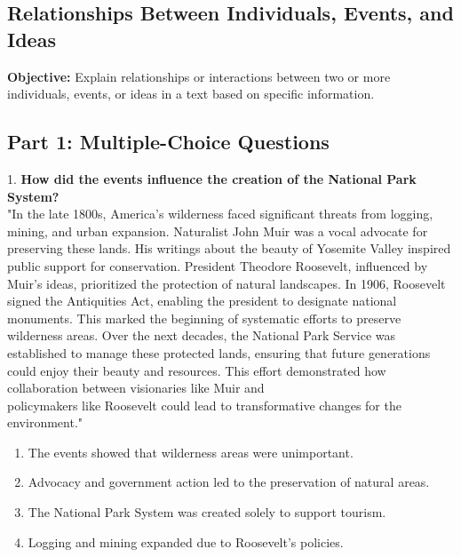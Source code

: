 \documentclass[12pt]{article}
\begin{document}
\subsection*{Relationships Between Individuals, Events, and Ideas}
\onehalfspacing

\begin{tcolorbox}[colframe=black!40, colback=gray!0, title=Learning Objective]
\textbf{Objective:} Explain relationships or interactions between two or more individuals, events, or ideas in a text based on specific information.
\end{tcolorbox}

\subsection*{Part 1: Multiple-Choice Questions}

1. \textbf{How did the events influence the creation of the National Park System?\\}
"In the late 1800s, America’s wilderness faced significant threats from logging, \\mining, and urban expansion. Naturalist John Muir was a vocal advocate for \\preserving these lands. His writings about the beauty of Yosemite Valley inspired public support for conservation. President Theodore Roosevelt, influenced by Muir’s ideas, prioritized the protection of natural landscapes. In 1906, Roosevelt signed the Antiquities Act, enabling the president to designate national monuments. This marked the beginning of systematic efforts to preserve wilderness areas. Over the next decades, the National Park Service was established to manage these protected lands, ensuring that future generations could enjoy their beauty and resources. This effort demonstrated how collaboration between visionaries like Muir and \\policymakers like Roosevelt could lead to transformative changes for the \\environment."\\
\begin{enumerate}[label=\Alph*.]
    \item The events showed that wilderness areas were unimportant.  
    \item Advocacy and government action led to the preservation of natural areas.  
    \item The National Park System was created solely to support tourism.  
    \item Logging and mining expanded due to Roosevelt’s policies.  
\end{enumerate}
\end{document}
